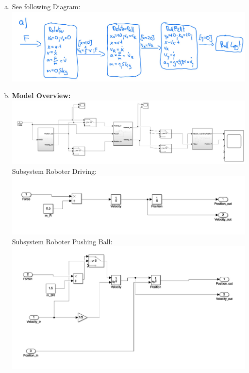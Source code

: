 \documentclass[12pt]{article}
\begin{document}
\begin{enumerate}[a)]
  \item 
      See following Diagram:\\
    \includegraphics[scale = 0.23]{pictures/pa4a}\\
  \item
      \textbf{Model Overview:}\\
    \includegraphics[scale = 0.19]{pictures/model1}\\
    Subsystem Roboter Driving:\\
    \includegraphics[scale = 0.29]{pictures/model2}\\
    \newpage
      Subsystem Roboter Pushing Ball:\\
    \includegraphics[scale = 0.29]{pictures/model3}\\

\end{enumerate}
\end{document}
